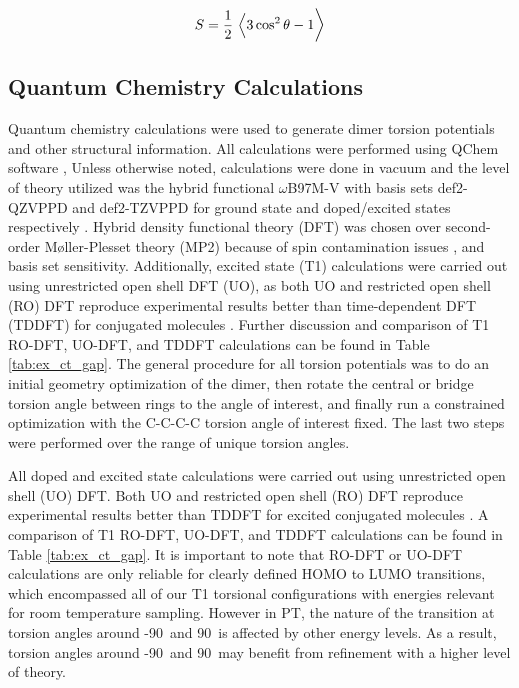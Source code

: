 \begin{equation}
\label{eq:S}
S = \frac{1}{2} \ \Big \langle \large 3\cos^2\theta - 1 \Big \rangle
\end{equation}

\subsection{Quantum Chemistry Calculations}
Quantum chemistry calculations were used to generate dimer torsion potentials and other structural information. All calculations were performed using QChem software \cite{Shao2015}, Unless otherwise noted, calculations were done in vacuum and the level of theory utilized was the hybrid functional $\omega$B97M-V with basis sets def2-QZVPPD and def2-TZVPPD for ground state and doped/excited states respectively \cite{Mardirossian2016, Weigend2005}. Hybrid density functional theory (DFT) was chosen over second-order M\o ller-Plesset theory (MP2) because of spin contamination issues \cite{Salzner2014}, and basis set sensitivity. Additionally, excited state (T1) calculations were carried out using unrestricted open shell DFT (UO), as both UO and restricted open shell (RO) DFT reproduce experimental results better than time-dependent DFT (TDDFT) for conjugated molecules \cite{Hait2016}. Further discussion and comparison of T1 RO-DFT, UO-DFT, and TDDFT calculations can be found in Table \ref{tab:ex_ct_gap}. The general procedure for all torsion potentials was to do an initial geometry optimization of the dimer, then rotate the central or bridge torsion angle between rings to the angle of interest, and finally run a constrained optimization with the C-C-C-C torsion angle of interest fixed. The last two steps were performed over the range of unique torsion angles.

All doped and excited state calculations were carried out using unrestricted open shell (UO) DFT. Both UO and restricted open shell (RO) DFT reproduce experimental results better than TDDFT for excited conjugated molecules \cite{Hait2016}. A comparison of T1 RO-DFT, UO-DFT, and TDDFT calculations can be found in Table \ref{tab:ex_ct_gap}. It is important to note that RO-DFT or UO-DFT calculations are only reliable for clearly defined HOMO to LUMO transitions, which encompassed all of our T1 torsional configurations with energies relevant for room temperature sampling. However in PT, the nature of the transition at torsion angles around -90\textdegree \ and 90\textdegree \ is affected by other energy levels. As a result, torsion angles around -90\textdegree \ and 90\textdegree \ may benefit from refinement with a higher level of theory.
